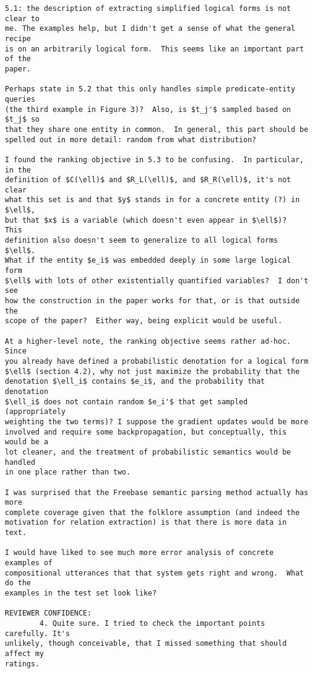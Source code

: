 \documentclass{article}[11pt,oneside]
\begin{document}
\begin{verbatim}
5.1: the description of extracting simplified logical forms is not clear to
me. The examples help, but I didn't get a sense of what the general recipe
is on an arbitrarily logical form.  This seems like an important part of the
paper.

Perhaps state in 5.2 that this only handles simple predicate-entity queries
(the third example in Figure 3)?  Also, is $t_j'$ sampled based on $t_j$ so
that they share one entity in common.  In general, this part should be
spelled out in more detail: random from what distribution?

I found the ranking objective in 5.3 to be confusing.  In particular, in the
definition of $C(\ell)$ and $R_L(\ell)$, and $R_R(\ell)$, it's not clear
what this set is and that $y$ stands in for a concrete entity (?) in $\ell$,
but that $x$ is a variable (which doesn't even appear in $\ell$)?  This
definition also doesn't seem to generalize to all logical forms $\ell$.
What if the entity $e_i$ was embedded deeply in some large logical form
$\ell$ with lots of other existentially quantified variables?  I don't see
how the construction in the paper works for that, or is that outside the
scope of the paper?  Either way, being explicit would be useful.

At a higher-level note, the ranking objective seems rather ad-hoc.  Since
you already have defined a probabilistic denotation for a logical form
$\ell$ (section 4.2), why not just maximize the probability that the
denotation $\ell_i$ contains $e_i$, and the probability that denotation
$\ell_i$ does not contain random $e_i'$ that get sampled (appropriately
weighting the two terms)? I suppose the gradient updates would be more
involved and require some backpropagation, but conceptually, this would be a
lot cleaner, and the treatment of probabilistic semantics would be handled
in one place rather than two.

I was surprised that the Freebase semantic parsing method actually has more
complete coverage given that the folklore assumption (and indeed the
motivation for relation extraction) is that there is more data in text.

I would have liked to see much more error analysis of concrete examples of
compositional utterances that that system gets right and wrong.  What do the
examples in the test set look like?

REVIEWER CONFIDENCE:
        4. Quite sure. I tried to check the important points carefully. It's
unlikely, though conceivable, that I missed something that should affect my
ratings.


\end{verbatim}
\end{document}
